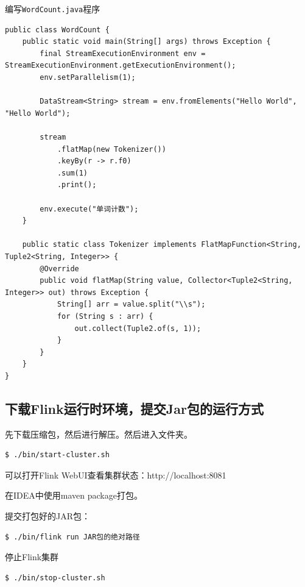 \documentclass[cn,11pt,chinese]{elegantbook}
\begin{document}
编写\texttt{WordCount.java}程序

\begin{verbatim}
public class WordCount {
    public static void main(String[] args) throws Exception {
        final StreamExecutionEnvironment env = StreamExecutionEnvironment.getExecutionEnvironment();
        env.setParallelism(1);

        DataStream<String> stream = env.fromElements("Hello World", "Hello World");

        stream
            .flatMap(new Tokenizer())
            .keyBy(r -> r.f0)
            .sum(1)
            .print();

        env.execute("单词计数");
    }

    public static class Tokenizer implements FlatMapFunction<String, Tuple2<String, Integer>> {
        @Override
        public void flatMap(String value, Collector<Tuple2<String, Integer>> out) throws Exception {
            String[] arr = value.split("\\s");
            for (String s : arr) {
                out.collect(Tuple2.of(s, 1));
            }
        }
    }
}
\end{verbatim}

\subsection{下载Flink运行时环境，提交Jar包的运行方式}

先下载压缩包，然后进行解压。然后进入文件夹。

\begin{verbatim}
$ ./bin/start-cluster.sh
\end{verbatim}

可以打开Flink WebUI查看集群状态：http://localhost:8081

在IDEA中使用maven package打包。

提交打包好的JAR包：

\begin{verbatim}
$ ./bin/flink run JAR包的绝对路径
\end{verbatim}

停止Flink集群

\begin{verbatim}
$ ./bin/stop-cluster.sh
\end{verbatim}
\end{document}
